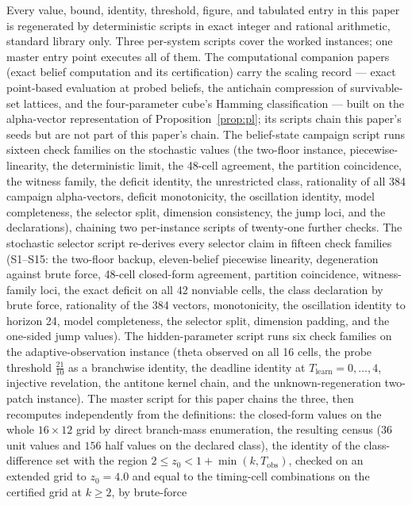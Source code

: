 \documentclass[10pt,twocolumn]{article}
\theoremstyle{plain}
\theoremstyle{definition}
\theoremstyle{remark}
\begin{document}
Every value, bound, identity, threshold, figure, and tabulated entry in
this paper is regenerated by deterministic scripts in exact integer and
rational arithmetic, standard library only. Three per-system scripts cover the worked instances; one master entry point executes all of them.
The computational companion papers (exact belief computation and its certification) carry the scaling record --- exact
point-based evaluation at probed beliefs, the antichain compression of
survivable-set lattices, and the four-parameter cube's Hamming
classification --- built on the alpha-vector representation of
Proposition~\ref{prop:pl}; its scripts chain this paper's seeds but
are not part of this paper's chain.
The belief-state campaign script runs sixteen check families on the
stochastic values (the two-floor instance, piecewise-linearity, the
deterministic limit, the 48-cell agreement, the partition coincidence,
the witness family, the deficit identity, the unrestricted class,
rationality of all 384 campaign alpha-vectors, deficit monotonicity, the
oscillation identity, model completeness, the selector split, dimension
consistency, the jump loci, and the declarations), chaining two
per-instance scripts of twenty-one further checks. The stochastic
selector script re-derives every selector claim in fifteen check
families (S1--S15: the two-floor backup, eleven-belief piecewise
linearity, degeneration against brute force, 48-cell closed-form
agreement, partition coincidence, witness-family loci, the exact
deficit on all 42 nonviable cells, the class declaration by brute
force, rationality of the 384 vectors, monotonicity, the oscillation
identity to horizon 24, model completeness, the selector split,
dimension padding, and the one-sided jump values). The hidden-parameter
script runs six check families on the adaptive-observation instance
(theta observed on all 16 cells, the probe threshold
\(\tfrac{21}{10}\) as a branchwise identity, the deadline identity at
\(T_{\mathrm{learn}} = 0, \dots, 4\), injective revelation, the
antitone kernel chain, and the unknown-regeneration two-patch
instance). The master script for this paper chains the three, then
recomputes independently from the definitions: the closed-form values on
the whole \(16 \times 12\) grid by direct branch-mass enumeration, the
resulting census (\(36\) unit values and \(156\) half values on the
declared class), the identity of the class-difference set with the region
\(2 \le z_{0} < 1 + \min(k, T_{\mathrm{obs}})\), checked on an
extended grid to \(z_{0} = 4.0\) and equal to the timing-cell
combinations on the certified grid at \(k \ge 2\), by brute-force
\end{document}

